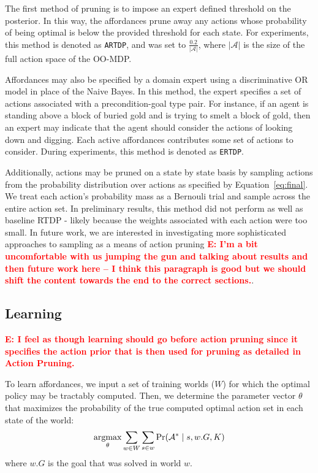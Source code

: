 \documentclass[conference]{IEEEtran}
\newcommand{\enote}[1]{\textcolor{Red}{\textbf{E: #1}}}
\newcommand{\argmax}{\operatornamewithlimits{argmax}} %
\begin{document}
The first method of pruning is to impose an expert defined threshold on the posterior. In this way, the affordances prune away any actions whose probability of being optimal is below the provided threshold for each state. For experiments, this method is denoted as \texttt{ARTDP}, and was set to $\frac{0.2}{|\mathcal{A}|}$, where $|\mathcal{A}|$ is the size of the full action space of the OO-MDP.

Affordances may also be specified by a domain expert using a discriminative OR model in place of the Naive Bayes. In this method, the expert specifies a set of actions associated with a precondition-goal type pair. For instance, if an agent is standing above a block of buried gold and is trying to smelt a block of gold, then an expert may indicate that the agent should consider the actions of looking down and digging. Each active affordances contributes some set of actions to consider. During experiments, this method is denoted as \texttt{ERTDP}.

Additionally, actions may be pruned on a state by state basis by sampling actions from the probability distribution over actions as specified by Equation~\ref{eq:final}. We treat each action's probability mass as a Bernouli trial and sample across the entire action set. In preliminary results, this method did not perform as well as baseline RTDP - likely because the weights associated with each action were too small. In future work, we are interested in investigating more sophisticated approaches to sampling as a means of action pruning 
\enote{I'm a bit uncomfortable with us jumping the gun and talking about results and then future work here -- I think this paragraph is good but we should shift the content towards the end to the correct sections.}.

\subsection{Learning}
\enote{I feel as though learning should go before action pruning since it specifies the action prior that is then used for pruning as detailed in Action Pruning.}

To learn affordances, we input a set of training worlds ($W$) for which the optimal policy
may be tractably computed. Then, we determine the parameter vector $\theta$ that 
maximizes the probability of the true computed optimal action set in each state of the world:
\begin{equation}
\argmax_\theta \sum_{w \in W} \sum_{s \in w} \Pr(\mathcal{A}^* \mid s, w.G, K)
\end{equation}
where $w.G$ is the goal that was solved in world $w$.
\end{document}
